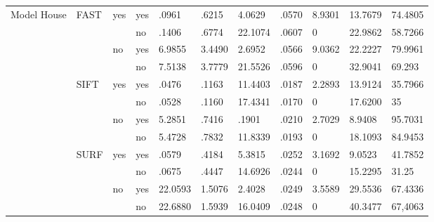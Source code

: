 \begin{table}
\begin{center}
\begin{tabular}{| l | l | l | l | l | l | l | l | l | l | l |}
			\multirow{12}{*}{Model House} 	& \multirow{4}{*}{FAST}	& \multirow{2}{*}{yes}	& 	yes	& .0961		& .6215	& 4.0629		& .0570	& 8.9301	& 13.7679	& 74.4805\\ \cline{4-11}
																&										& 									& no		& .1406		& .6774	& 22.1074	& .0607	& 0			& 22.9862	& 58.7266\\ \cline{3-11}
																&										& \multirow{2}{*}{no}	& yes	& 6.9855		& 3.4490	& 2.6952		& .0566	& 9.0362	& 22.2227	& 79.9961\\ \cline{4-11}
																&										&									& no		& 7.5138		& 3.7779	& 21.5526	& .0596	& 0			& 32.9041	& 69.293\\ \cline{2-11}
																& \multirow{4}{*}{SIFT}		& \multirow{2}{*}{yes}	& 	yes	& .0476		& .1163	& 11.4403	& .0187	& 2.2893	& 13.9124	& 35.7966\\ \cline{4-11}
																&										& 									& no		& .0528		& .1160	& 17.4341	& .0170	& 0			& 17.6200	& 35\\ \cline{3-11}
																&										& \multirow{2}{*}{no}	& yes	&	5.2851		& .7416	& .1901		& .0210	& 2.7029	& 8.9408		& 95.7031\\ \cline{4-11}
																&										&									& no		& 5.4728		& .7832	& 11.8339	& .0193	& 0			& 18.1093	& 84.9453 \\ \cline{2-11}
																& \multirow{4}{*}{SURF}  	& \multirow{2}{*}{yes}	& 	yes	& .0579		& .4184	& 5.3815		& .0252	& 3.1692	& 9.0523		& 41.7852\\ \cline{4-11}
																&										& 									& no		& .0675		& .4447	& 14.6926	& .0244	& 0			& 15.2295	& 31.25\\ \cline{3-11}
																&										& \multirow{2}{*}{no}	& yes	& 22.0593	& 1.5076	& 2.4028		& .0249	& 3.5589	& 29.5536	& 67.4336\\ \cline{4-11}
																&										&									& no		& 22.6880	& 1.5939	& 16.0409	& .0248	& 0			& 40.3477	& 67,4063\\ \hline
			

\end{tabular}
\end{center}
\end{table}
